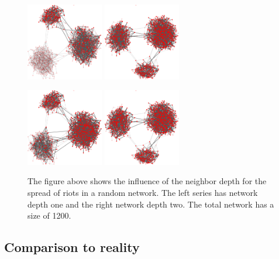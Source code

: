\begin{figure}
\includegraphics[width=0.3\textwidth]{randomgraphnbrdepth1/network750-crop.pdf}
\hskip2cm
\includegraphics[width=0.3\textwidth]{randomgraphnbrdepth2/network750-crop.pdf}

\includegraphics[width=0.3\textwidth]{randomgraphnbrdepth1/network1000-crop.pdf}
\hskip2cm
\includegraphics[width=0.3\textwidth]{randomgraphnbrdepth2/network1000-crop.pdf}

\caption{The figure above shows the influence of the neighbor depth for the spread of riots in a random network. The left series has network depth one and the right network depth two. The total network has a size of 1200.}
\label{influenceNBRdepthRANDOM}
\end{figure}

\subsection{Comparison to reality}
\label{sec:comparisontoreal}
